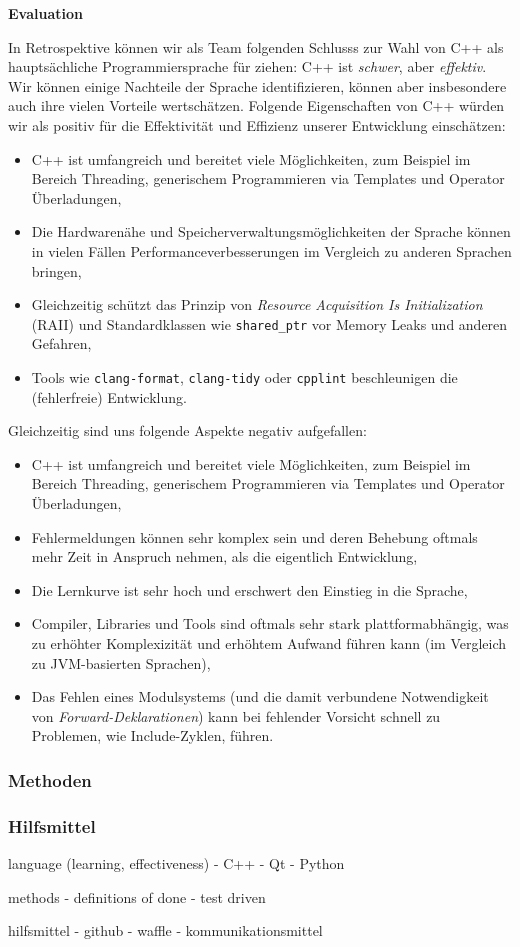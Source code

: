 \textbf{Evaluation}

In Retrospektive können wir als Team folgenden Schlusss zur Wahl von C++ als hauptsächliche Programmiersprache für \erasim{} ziehen: C++ ist \emph{schwer}, aber \emph{effektiv}. Wir können einige Nachteile der Sprache identifizieren, können aber insbesondere auch ihre vielen Vorteile wertschätzen. Folgende Eigenschaften von C++ würden wir als positiv für die Effektivität und Effizienz unserer Entwicklung einschätzen:
\vspace{-0.2cm}
\begin{itemize}
  \item C++ ist umfangreich und bereitet viele Möglichkeiten, zum Beispiel im
  Bereich Threading, generischem Programmieren via Templates und Operator
  Überladungen,
  \item Die Hardwarenähe und Speicherverwaltungsmöglichkeiten der Sprache können
  in vielen Fällen Performanceverbesserungen im Vergleich zu anderen Sprachen
  bringen,
  \item Gleichzeitig schützt das Prinzip von \emph{Resource Acquisition Is
  Initialization} (RAII) und Standardklassen wie \texttt{shared\_ptr} vor Memory
  Leaks und anderen Gefahren,
  \item Tools wie \texttt{clang-format}, \texttt{clang-tidy} oder
  \texttt{cpplint} beschleunigen die (fehlerfreie) Entwicklung.
\end{itemize}

Gleichzeitig sind uns folgende Aspekte negativ aufgefallen:
\vspace{-0.3cm}
\begin{itemize}
  \item C++ ist umfangreich und bereitet viele Möglichkeiten, zum Beispiel im
  Bereich Threading, generischem Programmieren via Templates und Operator
  Überladungen,
  \item Fehlermeldungen können sehr komplex sein und deren Behebung oftmals mehr
  Zeit in Anspruch nehmen, als die eigentlich Entwicklung,
  \item Die Lernkurve ist sehr hoch und erschwert den Einstieg in die Sprache,
  \item Compiler, Libraries und Tools sind oftmals sehr stark plattformabhängig,
  was zu erhöhter Komplexizität und erhöhtem Aufwand führen kann (im Vergleich
  zu JVM-basierten Sprachen),
  \item Das Fehlen eines Modulsystems (und die damit verbundene Notwendigkeit
  von \emph{Forward-Deklarationen}) kann bei fehlender Vorsicht schnell zu
  Problemen, wie Include-Zyklen, führen.

\end{itemize}

\subsubsection{Methoden}
\label{team:orga-workflow-methods}

\subsubsection{Hilfsmittel}
\label{team:orga-workflow-tools}

language (learning, effectiveness)
- C++
- Qt
- Python

methods
- definitions of done
- test driven

hilfsmittel
- github
- waffle
- kommunikationsmittel
